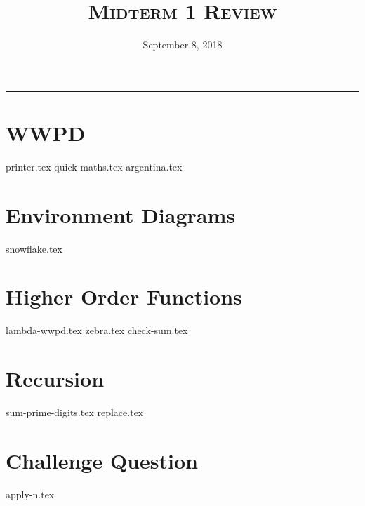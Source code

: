 \documentclass{exam}
\title{\textsc{Midterm 1 Review}}
\date{September 8, 2018}
\begin{document}
\maketitle
\rule{\textwidth}{0.15em}
\fontsize{12}{15}\selectfont


\section{WWPD}
\begin{questions}
{printer.tex}
{quick-maths.tex}
{argentina.tex}
\end{questions}

\newpage
\section{Environment Diagrams}
\begin{questions}
{snowflake.tex}
\end{questions}

\newpage
\section{Higher Order Functions}
\begin{questions}
{lambda-wwpd.tex}
{zebra.tex}
\newpage
{check-sum.tex}
\end{questions}

\newpage
\section{Recursion}
\begin{questions}
{sum-prime-digits.tex}
{replace.tex}
\end{questions}

\section{Challenge Question}
\begin{questions}
{apply-n.tex}
\end{questions}
\end{document}

